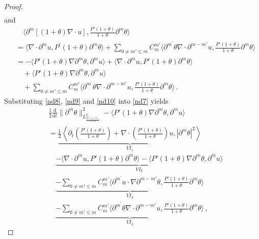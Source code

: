 \documentclass[reqno,11pt]{amsart}
\numberwithin{equation}{section}
\def\p{\partial}
\def\d{\mathrm{d}}
\begin{document}
\begin{proof}
\begin{equation}
\begin{aligned}
\end{aligned}
\end{equation}
and
\begin{equation}\label{nd10}
\begin{aligned}
 & \quad \langle \partial^m [(1+\theta) \nabla \cdot u], \frac{P'(1+\theta) }{1+\theta}\partial^m \theta \rangle \\
 & = \langle\nabla\cdot \p^m u,P^\prime(1+\theta)\p^m\theta\rangle +\sum_{0 \neq m' \leq m} C_m^{m'} \langle \partial^{m^\prime} \theta \nabla \cdot \partial^{m-m'} u, \frac{P'(1+\theta)} {1+\theta}\partial^m \theta \rangle \\
& = -\langle P'(1+\theta) \nabla \partial^m \theta, \partial^m u \rangle + \langle \nabla \cdot \partial^m u, P'(1+\theta) \partial^m \theta \rangle \\
&\quad + \langle P'(1+\theta) \nabla \partial^m \theta, \partial^m u \rangle\\&\quad + \sum_{0 \neq m' \leq m} C_m^{m'} \langle \partial^{m^\prime} \theta \nabla \cdot \partial^{m-m'} u,\frac{ P'(1+\theta)}{1+\theta}\partial^m \theta \rangle \,.
\end{aligned}
\end{equation}
Substituting \eqref{nd8}, \eqref{nd9} and \eqref{nd10} into \eqref{nd7} yields
\begin{equation}\label{nd11}
\begin{aligned}
&\frac{1}{2} \frac{\d}{\d t} \|\partial^m \theta\|^2_{L^2_{\frac{P'(1+\theta)}{1+\theta}}} - \langle P'(1+\theta) \nabla \partial^m \theta, \partial^m u \rangle \\&= \underset{VI_1}{\underbrace{\frac{1}{2} \left\langle \partial_t (\frac{P'(1+\theta)}{1+\theta}) + \nabla\cdot \left( \frac{P'(1+\theta)}{1+\theta} \right) u, |\partial^m \theta|^2 \right\rangle}} \\
&\quad \underset{VI_2}{\underbrace{- \langle \nabla \cdot \partial^m u, P'(1+\theta) \partial^m \theta \rangle  - \langle P'(1+\theta) \nabla \partial^m \theta, \partial^m u \rangle}}\\
&\quad \underset{VI_3}{\underbrace{- \sum_{0 \neq m' \leq m} C_m^{m'} \langle \partial^{m^\prime} u \cdot \nabla \partial^{m-m'} \theta, \frac{P'(1+\theta)}{1+\theta} \partial^m \theta \rangle}} \\
&\quad \underset{VI_4}{\underbrace{- \sum_{0 \neq m' \leq m} C_m^{m'} \langle \partial^{m^\prime} \theta \nabla \cdot \partial^{m-m'} u,\frac{P'(1+\theta)}{1+\theta} \partial^m \theta \rangle}} \,,
\end{aligned}
\end{equation}


\end{proof}
\end{document}
